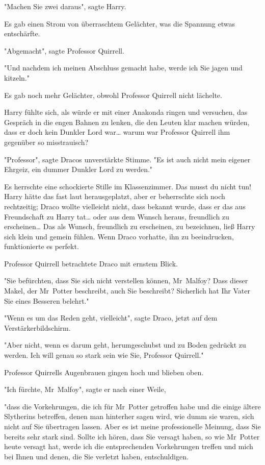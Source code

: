 {"Machen Sie zwei daraus", sagte Harry.

Es gab einen Strom von überraschtem Gelächter, was die Spannung etwas entschärfte.

"Abgemacht", sagte Professor Quirrell.

"Und nachdem ich meinen Abschluss gemacht habe, werde ich Sie jagen und kitzeln."

Es gab noch mehr Gelächter, obwohl Professor Quirrell nicht lächelte.

Harry fühlte sich, als würde er mit einer Anakonda ringen und versuchen, das Gespräch in die engen Bahnen zu lenken, die den Leuten klar machen würden, dass er doch kein Dunkler Lord war… warum war Professor Quirrell ihm gegenüber so misstrauisch?

"Professor", sagte Dracos unverstärkte Stimme. "Es ist auch nicht mein eigener Ehrgeiz, ein dummer Dunkler Lord zu werden."

Es herrschte eine schockierte Stille im Klassenzimmer. Das musst du nicht tun! Harry hätte das fast laut herausgeplatzt, aber er beherrschte sich noch rechtzeitig; Draco wollte vielleicht nicht, dass bekannt wurde, dass er das aus Freundschaft zu Harry tat… oder aus dem Wunsch heraus, freundlich zu erscheinen… Das als Wunsch, freundlich zu erscheinen, zu bezeichnen, ließ Harry sich klein und gemein fühlen. Wenn Draco vorhatte, ihn zu beeindrucken, funktionierte es perfekt.

Professor Quirrell betrachtete Draco mit ernstem Blick.

"Sie befürchten, dass Sie sich nicht verstellen können, Mr~Malfoy? Dass dieser Makel, der Mr~Potter beschreibt, auch Sie beschreibt? Sicherlich hat Ihr Vater Sie eines Besseren belehrt."

"Wenn es um das Reden geht, vielleicht", sagte Draco, jetzt auf dem Verstärkerbildschirm.

"Aber nicht, wenn es darum geht, herumgeschubst und zu Boden gedrückt zu werden. Ich will genau so stark sein wie Sie, Professor Quirrell."

Professor Quirrells Augenbrauen gingen hoch und blieben oben.

"Ich fürchte, Mr~Malfoy", sagte er nach einer Weile,

"dass die Vorkehrungen, die ich für Mr~Potter getroffen habe und die einige ältere Slytherins betreffen, denen man hinterher sagen wird, wie dumm sie waren, sich nicht auf Sie übertragen lassen. Aber es ist meine professionelle Meinung, dass Sie bereits sehr stark sind. Sollte ich hören, dass Sie versagt haben, so wie Mr~Potter heute versagt hat, werde ich die entsprechenden Vorkehrungen treffen und mich bei Ihnen und denen, die Sie verletzt haben, entschuldigen.

}
